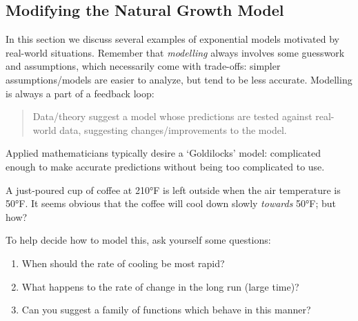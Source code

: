 \clearpage



\subsection{Modifying the Natural Growth Model}

In this section we discuss several examples of exponential models motivated by real-world situations. Remember that \emph{modelling} always involves some guesswork and assumptions, which necessarily come with trade-offs: simpler assumptions/models are easier to analyze, but tend to be less accurate. Modelling is always a part of a feedback loop:
\begin{quote}
	Data/theory suggest a model whose predictions are tested against real-world data, suggesting changes/improvements to the model.
\end{quote}
Applied mathematicians typically desire a `Goldilocks' model: complicated enough to make accurate predictions without being too complicated to use.



A just-poured cup of coffee at \ang{210}F is left outside when the air temperature is \ang{50}F. It seems obvious that the coffee will cool down slowly \emph{towards} \ang{50}F; but how?\smallbreak

To help decide how to model this, ask yourself some questions:

\begin{enumerate}
  \item When should the rate of cooling be most rapid?
  \item What happens to the rate of change in the long run (large time)?
  \item Can you suggest a family of functions which behave in this manner?
\end{enumerate}


